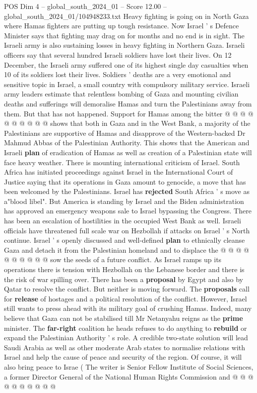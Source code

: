 \begin{textsample}{POS Dim 4 – global\_south\_2024\_01 – Score 12.00 – global\_south\_2024\_01/104948233.txt}
Heavy fighting is going on in North Gaza where Hamas fighters are putting up tough resistance.
Now Israel ' s Defence Minister says that fighting may drag on for months and no end is in sight.
The Israeli army is also sustaining losses in heavy fighting in Northern Gaza.
Israeli officers say that several hundred Israeli soldiers have lost their lives.
On 12 December, the Israeli army suffered one of its highest single day casualties when 10 of its soldiers lost their lives.
Soldiers ' deaths are a very emotional and sensitive topic in Israel, a small country with compulsory military service.
Israeli army leaders estimate that relentless bombing of Gaza and mounting civilian deaths and sufferings will demoralise Hamas and turn the Palestinians away from them.
But that has not happened.
Support for Hamas among the bitter @ @ @ @ @ @ @ @ @ @ shows that both in Gaza and in the West Bank, a majority of the Palestinians are supportive of Hamas and disapprove of the Western-backed Dr Mahmud Abbas of the Palestinian Authority.
This shows that the American and Israeli \textbf{plan} of eradication of Hamas as well as creation of a Palestinian state will face heavy weather.
There is mounting international criticism of Israel.
South Africa has initiated proceedings against Israel in the International Court of Justice saying that its operations in Gaza amount to genocide, a move that has been welcomed by the Palestinians.
Israel has \textbf{rejected} South Africa ' s move as a"blood libel".
But America is standing by Israel and the Biden administration has approved an emergency weapons sale to Israel bypassing the Congress.
There has been an escalation of hostilities in the occupied West Bank as well.
Israeli officials have threatened full scale war on Hezbollah if attacks on Israel ' s North continue.
Israel ' s openly discussed and well-defined \textbf{plan} to ethnically cleanse Gaza and detach it from the Palestinian homeland and to displace the @ @ @ @ @ @ @ @ @ @ sow the seeds of a future conflict.
As Israel ramps up its operations there is tension with Hezbollah on the Lebanese border and there is the risk of war spilling over.
There has been a \textbf{proposal} by Egypt and also by Qatar to resolve the conflict.
But neither is moving forward.
The \textbf{proposals} call for \textbf{release} of hostages and a political resolution of the conflict.
However, Israel still wants to press ahead with its military goal of crushing Hamas.
Indeed, many believe that Gaza can not be stabilised till Mr Netanyahu reigns as the \textbf{prime} minister.
The \textbf{far-right} coalition he heads refuses to do anything to \textbf{rebuild} or expand the Palestinian Authority ' s role.
A credible two-state solution will lead Saudi Arabia as well as other moderate Arab states to normalise relations with Israel and help the cause of peace and security of the region.
Of course, it will also bring peace to Israe ( The writer is Senior Fellow Institute of Social Sciences, a former Director General of the National Human Rights Commission and @ @ @ @ @ @ @ @ @ @

\end{textsample}
